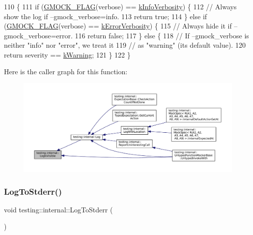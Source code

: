 \begin{DoxyCode}
110                                                    \{
111   \textcolor{keywordflow}{if} (\hyperlink{gmock-port_8h_ad7119adfef06be5e7b1551633f5a1436}{GMOCK\_FLAG}(verbose) == \hyperlink{namespacetesting_1_1internal_a96274a788ffc75a6dffdfa8aa1f34fb9}{kInfoVerbosity}) \{
112     \textcolor{comment}{// Always show the log if --gmock\_verbose=info.}
113     \textcolor{keywordflow}{return} \textcolor{keyword}{true};
114   \} \textcolor{keywordflow}{else} \textcolor{keywordflow}{if} (\hyperlink{gmock-port_8h_ad7119adfef06be5e7b1551633f5a1436}{GMOCK\_FLAG}(verbose) == \hyperlink{namespacetesting_1_1internal_a3d730761274e7b80dd66e5014171fcb5}{kErrorVerbosity}) \{
115     \textcolor{comment}{// Always hide it if --gmock\_verbose=error.}
116     \textcolor{keywordflow}{return} \textcolor{keyword}{false};
117   \} \textcolor{keywordflow}{else} \{
118     \textcolor{comment}{// If --gmock\_verbose is neither "info" nor "error", we treat it}
119     \textcolor{comment}{// as "warning" (its default value).}
120     \textcolor{keywordflow}{return} severity == \hyperlink{namespacetesting_1_1internal_a203d1a8a2147a53d12bbdae40d443914a5beeeab1b0a3caabd0afb43356c1a271}{kWarning};
121   \}
122 \}
\end{DoxyCode}
Here is the caller graph for this function\+:
\nopagebreak
\begin{figure}[H]
\begin{center}
\leavevmode
\includegraphics[width=350pt]{namespacetesting_1_1internal_a69ffdba5ee36743e88d8f89b79e566ff_icgraph}
\end{center}
\end{figure}
\mbox{\label{namespacetesting_1_1internal_a06b1b20029fbd1dbeb59752f914fab84}} 
\subsubsection{\texorpdfstring{Log\+To\+Stderr()}{LogToStderr()}}
{\footnotesize\ttfamily void testing\+::internal\+::\+Log\+To\+Stderr (\begin{DoxyParamCaption}{ }\end{DoxyParamCaption})\hspace{0.3cm}{\ttfamily [inline]}}



